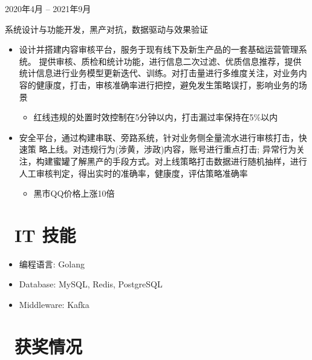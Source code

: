 \documentclass{resume}
\begin{document}
 {2020年4月 -- 2021年9月}
\begin{onehalfspacing}
系统设计与功能开发，黑产对抗，数据驱动与效果验证
\begin{itemize}
  \item 设计并搭建内容审核平台，服务于现有线下及新生产品的一套基础运营管理系统。 提供审核、质检和统计功能，进行信息二次过滤、优质信息推荐，提供统计信息进行业务模型更新迭代、训练。对打击量进行多维度关注，对业务内容的健康度，打击，审核准确率进行把控，避免发生策略误打，影响业务的场景
  \begin{itemize}
    \item 红线违规的处置时效控制在5分钟以内，打击漏过率保持在5\%以内
  \end{itemize}
  \item 安全平台，通过构建串联、旁路系统，针对业务侧全量流水进行审核打击，快速策 略上线。对违规行为(涉黄，涉政)内容，账号进行重点打击; 异常行为关注，构建蜜罐了解黑产的手段方式。对上线策略打击数据进行随机抽样，进行人工审核判定，得出实时的准确率，健康度，评估策略准确率
  \begin{itemize}
    \item 黑市QQ价格上涨10倍
  \end{itemize}
\end{itemize}
\end{onehalfspacing}



\section{\faCogs\ IT 技能}
\begin{itemize}[parsep=0.5ex]
  \item 编程语言: Golang
  \item Database: MySQL, Redis, PostgreSQL
  \item Middleware: Kafka
\end{itemize}

\section{\faHeartO\ 获奖情况}
\end{document}
